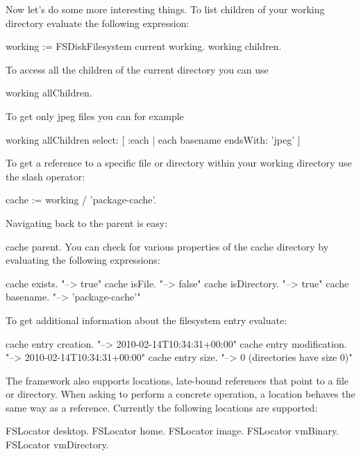 \documentclass[a4paper,10pt,twoside]{book}
\begin{document}
Now let's do some more interesting things. To list children of your working directory evaluate the following expression:

\begin{code}{}
working := FSDiskFilesystem current working.
working children.
\end{code} 

To access all the children of the current directory you can use 

\begin{code}{}
working allChildren.
\end{code}


To get only jpeg files you can for example 
\begin{code}{}
working allChildren select: [ :each | each basename endsWith: 'jpeg' ]
\end{code} 
 
To get a reference to a specific file or directory within your working directory use the slash operator:

\begin{code}{}
 cache := working / 'package-cache'.
\end{code} 

Navigating back to the parent is easy:

 cache parent.
You can check for various properties of the cache directory by evaluating the following expressions:
\begin{code}{}
 cache exists.             "--> true"
 cache isFile.             "--> false"
 cache isDirectory.        "--> true"
 cache basename.           "--> 'package-cache'"
\end{code} 
 
To get additional information about the filesystem entry evaluate:

\begin{code}{}
 cache entry creation.     "--> 2010-02-14T10:34:31+00:00"
 cache entry modification. "--> 2010-02-14T10:34:31+00:00"
 cache entry size.         "--> 0 (directories have size 0)"
\end{code} 
The framework also supports locations, late-bound references that point to a file or directory. When asking to perform a concrete operation, a location behaves the same way as a reference. Currently the following locations are supported:

\begin{code}{}
 FSLocator desktop.
 FSLocator home.
 FSLocator image.
 FSLocator vmBinary.
 FSLocator vmDirectory.
\end{code} 
\end{document}
